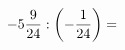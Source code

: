 \documentclass[preview]{standalone}
\begin{document}
\begin{align*}
-5 { 9 \over 24 }  :  \left( - { 1 \over 24 } \right)  =
\end{align*}
\end{document}
